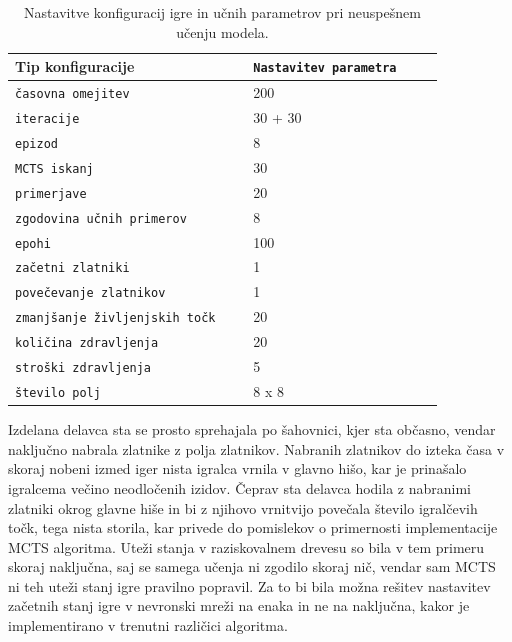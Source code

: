 \documentclass[a4paper, 12pt]{book}
\begin{document}
\begin{table}
	\begin{center}
		\begin{tabular}{p{0.5\linewidth}|p{0.4\linewidth}}
			Tip konfiguracije                          & {\tt Nastavitev parametra} \\ \hline
			{\tt časovna omejitev}                     & 200                     \\
			{\tt iteracije}                            & 30 + 30                 \\
			{\tt epizod}                               & 8                       \\
			{\tt MCTS iskanj}                          & 30                      \\
			{\tt primerjave}                           & 20                      \\
			{\tt zgodovina učnih primerov}             & 8                       \\
			{\tt epohi}                                & 100                     \\
			{\tt začetni zlatniki}                     & 1                       \\
			{\tt povečevanje zlatnikov}                & 1                       \\
			{\tt zmanjšanje življenjskih točk}         & 20                      \\
			{\tt količina zdravljenja}                 & 20                      \\
			{\tt stroški zdravljenja}                  & 5                       \\
			{\tt število polj}                         & 8 x 8                   \\
			
		\end{tabular}
	\end{center}
	\caption{Nastavitve konfiguracij igre in učnih parametrov pri neuspešnem učenju modela.}
	\label{tabelLearnConfig}
\end{table}

Izdelana delavca sta se prosto sprehajala po šahovnici, kjer sta občasno, vendar naključno nabrala zlatnike z polja zlatnikov.
Nabranih zlatnikov do izteka časa v skoraj nobeni izmed iger nista igralca vrnila v glavno hišo, kar je prinašalo igralcema večino neodločenih izidov.
Čeprav sta delavca hodila z nabranimi zlatniki okrog glavne hiše in bi z njihovo vrnitvijo povečala število igralčevih točk, tega nista storila, kar privede do pomislekov o primernosti implementacije MCTS algoritma.
Uteži stanja v raziskovalnem drevesu so bila v tem primeru skoraj naključna, saj se samega učenja ni zgodilo skoraj nič, vendar sam MCTS ni teh uteži stanj igre pravilno popravil.
Za to bi bila možna rešitev nastavitev začetnih stanj igre v nevronski mreži na enaka in ne na naključna, kakor je implementirano v trenutni različici algoritma.
\end{document}
